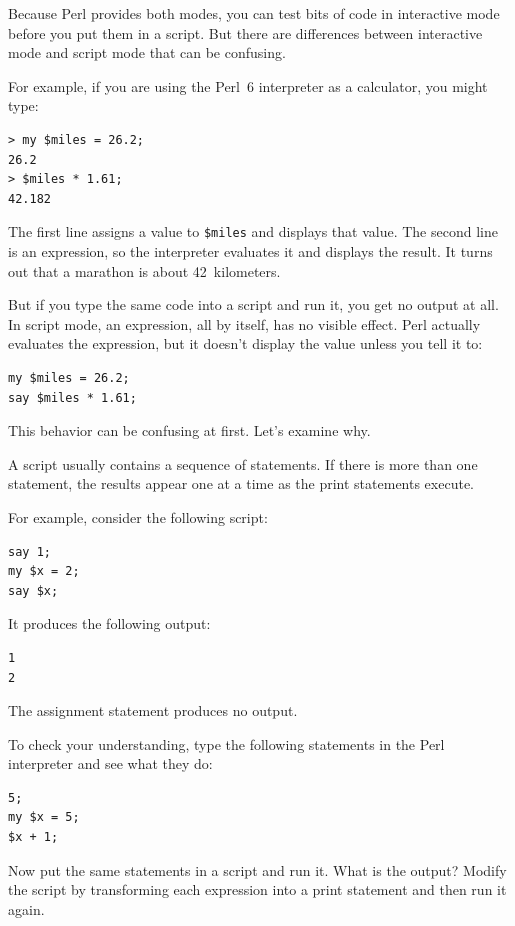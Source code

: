 Because Perl provides both modes,
you can test bits of code in interactive mode before you put them
in a script.  But there are differences between interactive mode
and script mode that can be confusing.

For example, if you are using the Perl~6 interpreter as a 
calculator, you might type:

\begin{verbatim}
> my $miles = 26.2;
26.2
> $miles * 1.61;
42.182
\end{verbatim}

The first line assigns a value to {\tt \$miles} and displays that value.  
The second line is an expression, so the
interpreter evaluates it and displays the result.  It turns out that a
marathon is about 42~kilometers.

But if you type the same code into a script and run it, you get no
output at all.  In script mode, an expression, all by itself, has no
visible effect.  Perl actually evaluates the expression, but it doesn't
display the value unless you tell it to:

\begin{verbatim}
my $miles = 26.2;
say $miles * 1.61;
\end{verbatim}

This behavior can be confusing at first. Let's examine why.

A script usually contains a sequence of statements.  If there
is more than one statement, the results appear one at a time
as the print statements execute.

For example, consider the following script:

\begin{verbatim}
say 1;
my $x = 2;
say $x;
\end{verbatim}
%
It produces the following output:

\begin{verbatim}
1
2
\end{verbatim}
%
The assignment statement produces no output.

To check your understanding, type the following statements in the
Perl interpreter and see what they do:

\begin{verbatim}
5;
my $x = 5;
$x + 1;
\end{verbatim}

Now put the same statements in a script and run it.  What
is the output?  Modify the script by transforming each
expression into a print statement and then run it again.

